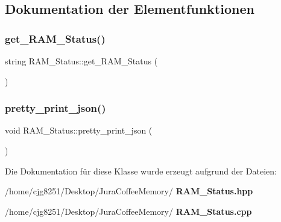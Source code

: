 \subsection{Dokumentation der Elementfunktionen}
\mbox{\label{class_r_a_m___status_aa4e4c37f9eecaa92dbf6ab6805fba5fc}} 
\subsubsection{get\+\_\+\+R\+A\+M\+\_\+\+Status()}
{\footnotesize\ttfamily string R\+A\+M\+\_\+\+Status\+::get\+\_\+\+R\+A\+M\+\_\+\+Status (\begin{DoxyParamCaption}{ }\end{DoxyParamCaption})}

\mbox{\label{class_r_a_m___status_a098ae3e77c3185c33852f0d3c621af4f}} 
\subsubsection{pretty\+\_\+print\+\_\+json()}
{\footnotesize\ttfamily void R\+A\+M\+\_\+\+Status\+::pretty\+\_\+print\+\_\+json (\begin{DoxyParamCaption}{ }\end{DoxyParamCaption})}



Die Dokumentation für diese Klasse wurde erzeugt aufgrund der Dateien\+:\begin{DoxyCompactItemize}
\item 
/home/cjg8251/\+Desktop/\+Jura\+Coffee\+Memory/\textbf{ R\+A\+M\+\_\+\+Status.\+hpp}\item 
/home/cjg8251/\+Desktop/\+Jura\+Coffee\+Memory/\textbf{ R\+A\+M\+\_\+\+Status.\+cpp}\end{DoxyCompactItemize}
